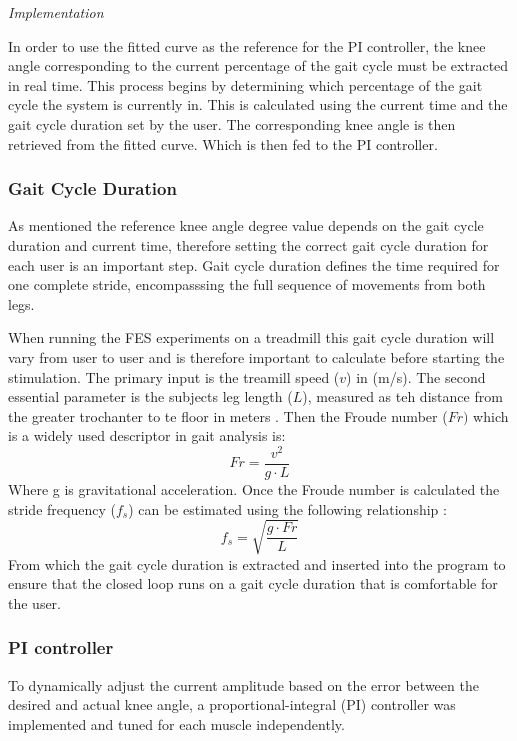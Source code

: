 \textit{Implementation}

In order to use the fitted curve as the reference for the PI controller, the knee angle corresponding to the current percentage of the gait cycle must be extracted in real time. This process begins by determining which percentage of the gait cycle the system is currently in. This is calculated using the current time and the gait cycle duration set by the user. The corresponding knee angle is then retrieved from the fitted curve. Which is then fed to the PI controller.

\subsubsection{Gait Cycle Duration}
As mentioned the reference knee angle degree value depends on the gait cycle duration and current time, therefore setting the correct gait cycle duration for each user is an important step. Gait cycle duration defines the time required for one complete stride, encompasssing the full sequence of movements from both legs. 

When running the FES experiments on a treadmill this gait cycle duration will vary from user to user and is therefore important to calculate before starting the stimulation. The primary input is the treamill speed (\(v\)) in (m/s). The second essential parameter is the subjects leg length (\(L\)), measured as teh distance from the greater trochanter to te floor in meters . Then the Froude number (\(Fr)\) which is a widely used descriptor in gait analysis is:
\begin{equation}
    Fr = \frac{v^2}{g \cdot L}
\end{equation}
Where g is gravitational acceleration. Once the Froude number is calculated the stride frequency (\(f_s\)) can be estimated using the following relationship :
\begin{equation}
    f_s = \sqrt{\frac{g \cdot Fr}{L}}
\end{equation}
From which the gait cycle duration is extracted and inserted into the program to ensure that the closed loop runs on a gait cycle duration that is comfortable for the user.


\subsubsection{PI controller}
To dynamically adjust the current amplitude based on the error between the desired and actual knee angle, a proportional-integral (PI) controller was implemented and tuned for each muscle independently. 
\newline



